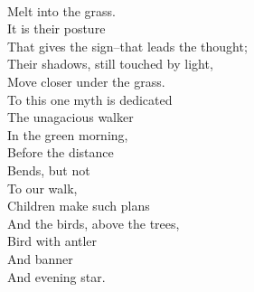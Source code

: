 \documentclass[smalldemyvopaper,11pt,twoside,onecolumn,openright,extrafontsizes]{memoir}
\begin{document}
\\Melt into the grass.
\\It is their posture
\\That gives the sign--that leads the thought;
\\Their shadows, still touched by light,
\\Move closer under the grass.
\\To this one myth is dedicated
\\The unagacious walker
\\In the green morning,
\\Before the distance
\\Bends, but not
\\To our walk,
\\Children make such plans
\\And the birds, above the trees,
\\Bird with antler
\\And banner
\\And evening star.
\end{document}
